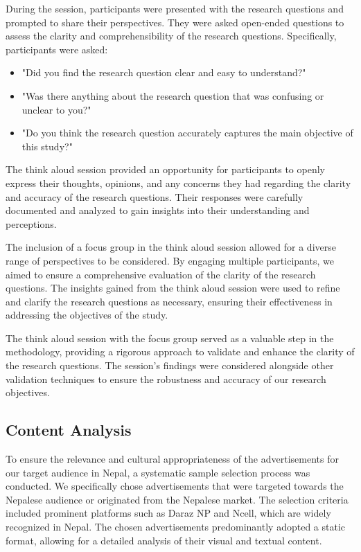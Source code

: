 \documentclass[journal]{IEEEtran}
\begin{document}
During the session, participants were presented with the research questions and prompted
to share their perspectives. They were asked open-ended questions to assess the clarity
and comprehensibility of the research questions. Specifically, participants were asked:

\begin{itemize}
    \item "Did you find the research question clear and easy to understand?"
    \item "Was there anything about the research question that was confusing or unclear to you?"
    \item "Do you think the research question accurately captures the main objective of this study?"
\end{itemize}

The think aloud session provided an opportunity for participants to openly express their
thoughts, opinions, and any concerns they had regarding the clarity and accuracy of the
research questions. Their responses were carefully documented and analyzed to gain
insights into their understanding and perceptions.

The inclusion of a focus group in the think aloud session allowed for a diverse range of
perspectives to be considered. By engaging multiple participants, we aimed to ensure
a comprehensive evaluation of the clarity of the research questions. The insights
gained from the think aloud session were used to refine and clarify the research
questions as necessary, ensuring their effectiveness in addressing the objectives of
the study.

The think aloud session with the focus group served as a valuable step in the methodology,
providing a rigorous approach to validate and enhance the clarity of the research
questions. The session's findings were considered alongside other validation techniques
to ensure the robustness and accuracy of our research objectives.

\subsection{Content Analysis}
To ensure the relevance and cultural appropriateness of the advertisements for our target
audience in Nepal, a systematic sample selection process was conducted. We specifically
chose advertisements that were targeted towards the Nepalese audience or originated from
the Nepalese market. The selection criteria included prominent platforms such as Daraz NP
and Ncell, which are widely recognized in Nepal. The chosen advertisements predominantly
adopted a static format, allowing for a detailed analysis of their visual and textual content.
\end{document}
